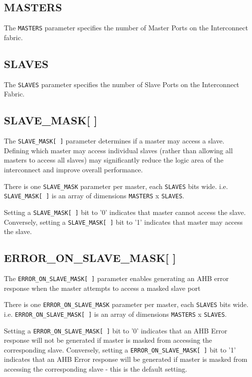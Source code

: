 \subsection{MASTERS}\label{masters}

The \texttt{MASTERS} parameter specifies the number of Master Ports on the
Interconnect fabric.

\subsection{SLAVES}\label{slaves}

The \texttt{SLAVES} parameter specifies the number of Slave Ports on the
Interconnect Fabric.

\subsection{SLAVE\_MASK[ ]}\label{slave_mask}

The \texttt{SLAVE\_MASK[\,]} parameter determines if a master may access a slave. Defining which
master may access individual slaves (rather than allowing all masters to access all slaves) may
significantly reduce the logic area of the interconnect and improve overall performance.

There is one \texttt{SLAVE\_MASK} parameter per master, each \texttt{SLAVES} bits wide.
i.e. \texttt{SLAVE\_MASK[\,]} is an array of dimensions \texttt{MASTERS} x \texttt{SLAVES}.

Setting a \texttt{SLAVE\_MASK[\,]} bit to '0' indicates that master cannot access the slave.
Conversely, setting a \texttt{SLAVE\_MASK[\,]} bit to '1' indicates that master may access the slave.

\subsection{ERROR\_ON\_SLAVE\_MASK[ ]}\label{error_on_slave_mask}

The \texttt{ERROR\_ON\_SLAVE\_MASK[\,]} parameter enables generating an AHB error response when the
master attempts to access a masked slave port

There is one \texttt{ERROR\_ON\_SLAVE\_MASK} parameter per master, each \texttt{SLAVES} bits wide.
i.e. \texttt{ERROR\_ON\_SLAVE\_MASK[\,]} is an array of dimensions \texttt{MASTERS} x \texttt{SLAVES}.

Setting a \texttt{ERROR\_ON\_SLAVE\_MASK[\,]} bit to '0' indicates that an AHB Error response will not be generated
if master is masked from accessing the corresponding slave.
Conversely, setting a \texttt{ERROR\_ON\_SLAVE\_MASK[\,]} bit to '1' indicates that an AHB Error response will
be generated if master is masked from accessing the corresponding slave - this is the default setting.
